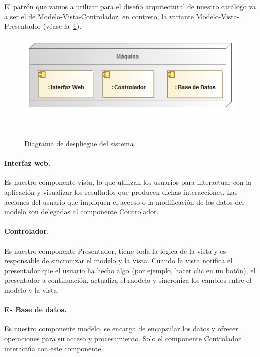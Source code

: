 El patrón que vamos a utilizar para el diseño arquitectural de nuestro 
catálogo va a ser el de Modelo-Vista-Controlador, en contreto, la variante Modelo-Vista-Presentador 
(véase la~\cref{fig:diagDespliegue}).

\vspace{.2cm}
\begin{figure}[ht]
\centerline{\includegraphics[scale=0.6]{img/diagrama_despliegue}}\
\caption{Diagrama de despliegue del sistema}
\label{fig:diagDespliegue}
\end{figure}


\paragraph{Interfaz web.} Es nuestro componente vista, lo que utilizan los usuarios para 
interactuar con la aplicación y visualizar los resultados que producen dichas
interacciones. Las acciones del usuario que impliquen el acceso o la modificación
de los datos del modelo son delegadas al componente Controlador.

\paragraph{Controlador.} Es nuestro componente Presentador, tiene toda la lógica de la vista 
y es responsable de sincronizar el modelo y la vista. Cuando la vista notifica el 
presentador que el usuario ha hecho algo (por ejemplo, hacer clic en un botón), 
el presentador a continuación, actualiza el modelo y sincroniza los cambios 
entre el modelo y la vista.

\paragraph{Es Base de datos.} Es nuestro componente modelo, se encarga de encapsular 
los datos y ofrecer operaciones para su acceso y procesamiento. Solo el componente
Controlador interactúa con este componente.